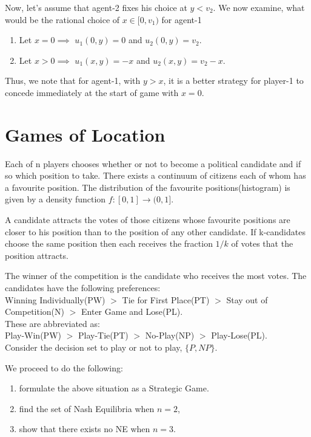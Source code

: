 \documentclass[11pt]{article}
\theoremstyle{definition}
\begin{document}
Now, let's assume that agent-2 fixes his choice at $y<v_2$. We now examine, what would be the rational choice of $x\in[0,v_1)$ for agent-1
\begin{enumerate}
\item Let $x=0 \implies$ $u_1(0,y) =0$ and $u_2(0,y)= v_2$.
\item Let $x>0 \implies$ $u_1(x,y) = -x$ and $u_2(x,y) = v_2 - x$. 
\end{enumerate}
Thus, we note that for agent-1, with $y>x$, it is a better strategy for player-1 to concede immediately at the start of game  with $x=0$.


\section{Games of Location}
Each of n players chooses whether or not to become a political candidate and if so which position to take. There exists a continuum of citizens each of whom has a favourite position. The distribution of the favourite positions(histogram) is given by a density function $f:[0,1] \rightarrow (0,1]$.

A candidate attracts the votes of those citizens whose favourite positions are closer to his position than to the position of any other candidate. If k-candidates choose the same position then each receives the fraction $1/k$ of votes that the position attracts. 

The winner of the competition is the candidate who receives the most votes. The candidates have the following preferences: \\
{Winning Individually(PW)} $>$ {Tie for First Place(PT)} $>$ {Stay out of Competition(N)} $>$ {Enter Game and Lose(PL)}.\\
These are abbreviated as:\\
Play-Win(PW) $>$ Play-Tie(PT) $>$ No-Play(NP) $>$ Play-Lose(PL).\\
Consider the decision set to play or not to play, $\{P,NP\}$.

We proceed to do the following:
\begin{enumerate}
\item formulate the above situation as a Strategic Game.
\item find the set of Nash Equilibria when $n=2$,
\item show that there exists no NE when $n=3$.
\end{enumerate}
\end{document}

